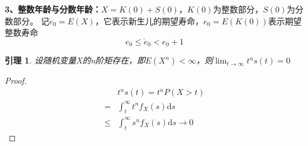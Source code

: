 \documentclass[12pt, a4paper, oneside]{ctexbook}
\newtheorem{lemma}[theorem]{引理}
\begin{document}
\textbf{3、整数年龄与分数年龄：}$X = K(0) + S(0)$，$K(0)$为整数部分，$S(0)$为分数部分。
记$\mathring{e}_0 = E(X)$，它表示新生儿的期望寿命，$e_0 = E(K(0))$表示期望整数寿命
\begin{equation*}
    e_0 \leq \mathring{e}_0 < e_0 + 1
\end{equation*}

\begin{lemma}\label{le1.1.5}
    设随机变量X的n阶矩存在，即$E(X^n) < \infty$，则$\lim_{t \rightarrow \infty}t^ns(t) = 0$
\end{lemma}
\begin{proof}
    \begin{equation*}
        \begin{aligned}
                 & t^n s(t) = t^nP(X>t)                                 \\
            =    & \int_{t}^{\infty} t^nf_X(s)\mathrm{d}s               \\
            \leq & \int_{t}^{\infty} s^nf_X(s)\mathrm{d}s \rightarrow 0
        \end{aligned}
    \end{equation*}
\end{proof}
\end{document}
